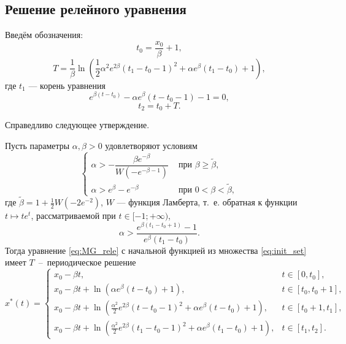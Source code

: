 \subsection{Решение релейного уравнения}
Введём обозначения:
\begin{equation}
    \label{eq:t0:ch1}
    t_0 = \frac{x_0}{\beta} + 1,
\end{equation}
\begin{equation}
    \label{eq:T}
    T = \frac{1}{\beta} \ln\left(\frac{1}{2}\alpha^2e^{2\beta}(t_1 - t_0 - 1)^2 + \alpha e^{\beta}(t_1 - t_0) + 1\right),
\end{equation}
где $t_1$ --- корень уравнения 
\begin{equation}
    \label{eq:t1_cond_exp}
    e^{\beta (t - t_0)} - \alpha e^{\beta} (t - t_0 - 1) - 1 = 0,
\end{equation}
\begin{equation}
    \label{eq:t2_period}
    t_2 = t_0 + T.
\end{equation}

Справедливо следующее утверждение.

\begin{theorem}\label{thm:relay}
Пусть параметры $\alpha,\beta>0$ удовлетворяют условиям
%
\begin{equation}
    \label{eq:cond_alpha1}
	\begin{cases}
    \alpha > -\dfrac{\beta e^{-\beta}}{W(-e^{-\beta - 1})} & \text{ при } \beta \geq \tilde{\beta},\\
	\alpha > e^{\beta} - e^{-\beta} & \text{ при } 0 < \beta < \tilde{\beta},
	\end{cases}
\end{equation}
где $\tilde{\beta} = 1 + \frac{1}{2} W(-2 e^{-2})$, $W$ --- функция Ламберта, т.~е. обратная к функции $t \mapsto te^t$, рассматриваемой при $t \in [-1; +\infty)$,
\begin{equation}
    \label{eq:cond_alpha2}
    \alpha > \dfrac{e^{\beta(t_1 - t_0 + 1)} - 1}{e^{\beta}(t_1 - t_0)}.
\end{equation}
%
Тогда уравнение \eqref{eq:MG_rele} с начальной функцией из множества \eqref{eq:init_set} имеет $T$~--~периодическое решение
\small
\begin{equation}
    \label{eq:sol_x*}
x^*(t)= 
\begin{cases}
    x_0-\beta t, & t\in[0,t_0],\\
    x_0-\beta t +\ln(\alpha e^{\beta}(t-t_0)+1), & t\in[t_0,t_0+1],\\
    x_0-\beta t + \ln(\frac{\alpha^2}{2}e^{2\beta}(t-t_0-1)^2+\alpha e^{\beta}(t-t_0)+1), & t\in[t_0+1,t_1],\\
    x_0-\beta t + \ln(\frac{\alpha^2}{2}e^{2\beta}(t_1-t_0-1)^2+\alpha e^{\beta}(t_1-t_0)+1), & t\in[t_1,t_2].
\end{cases}
\end{equation}
\normalsize
\end{theorem}

